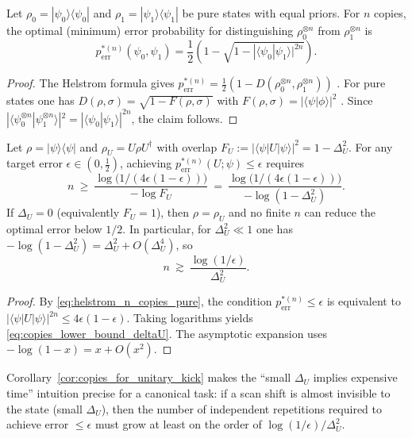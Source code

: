 \begin{proposition}
\label{prop:helstrom_n_copies_pure}
Let $\rho_0=|\psi_0\rangle\langle\psi_0|$ and $\rho_1=|\psi_1\rangle\langle\psi_1|$ be pure states with equal priors.
For $n$ copies, the optimal (minimum) error probability for distinguishing $\rho_0^{\otimes n}$ from $\rho_1^{\otimes n}$ is
\begin{equation}
p_{\mathrm{err}}^{*(n)}(\psi_0,\psi_1)=\frac12\left(1-\sqrt{1-|\langle\psi_0|\psi_1\rangle|^{2n}}\right).
\label{eq:helstrom_n_copies_pure}
\end{equation}
\end{proposition}

\begin{proof}
The Helstrom formula gives $p_{\mathrm{err}}^{*(n)}=\tfrac12(1-D(\rho_0^{\otimes n},\rho_1^{\otimes n}))$ \cite{Helstrom1976,Watrous2018}.
For pure states one has $D(\rho,\sigma)=\sqrt{1-F(\rho,\sigma)}$ with $F(\rho,\sigma)=|\langle\psi|\phi\rangle|^2$ \cite{Watrous2018}.
Since $|\langle\psi_0^{\otimes n}|\psi_1^{\otimes n}\rangle|^2=|\langle\psi_0|\psi_1\rangle|^{2n}$, the claim follows.
\end{proof}

\begin{corollary}
\label{cor:copies_for_unitary_kick}
Let $\rho=|\psi\rangle\langle\psi|$ and $\rho_U=U\rho U^{\dagger}$ with overlap $F_U:=|\langle\psi|U|\psi\rangle|^2=1-\Delta_U^2$.
For any target error $\epsilon\in(0,\tfrac12)$, achieving $p_{\mathrm{err}}^{*(n)}(U;\psi)\le\epsilon$ requires
\begin{equation}
n\ \ge\ \frac{\log\!\bigl(1/(4\epsilon(1-\epsilon))\bigr)}{-\log F_U}
\ =\ \frac{\log\!\bigl(1/(4\epsilon(1-\epsilon))\bigr)}{-\log(1-\Delta_U^2)}.
\label{eq:copies_lower_bound_deltaU}
\end{equation}
If $\Delta_U=0$ (equivalently $F_U=1$), then $\rho=\rho_U$ and no finite $n$ can reduce the optimal error below $1/2$.
In particular, for $\Delta_U^2\ll 1$ one has $-\log(1-\Delta_U^2)=\Delta_U^2+O(\Delta_U^4)$, so
\begin{equation}
n\ \gtrsim\ \frac{\log(1/\epsilon)}{\Delta_U^2}.
\label{eq:copies_asymptotic_deltaU}
\end{equation}
\end{corollary}

\begin{proof}
By \eqref{eq:helstrom_n_copies_pure}, the condition $p_{\mathrm{err}}^{*(n)}\le\epsilon$ is equivalent to
$|\langle\psi|U|\psi\rangle|^{2n}\le 4\epsilon(1-\epsilon)$.
Taking logarithms yields \eqref{eq:copies_lower_bound_deltaU}.
The asymptotic expansion uses $-\log(1-x)=x+O(x^2)$.
\end{proof}

Corollary~\ref{cor:copies_for_unitary_kick} makes the ``small $\Delta_U$ implies expensive time'' intuition precise for a canonical task:
if a scan shift is almost invisible to the state (small $\Delta_U$), then the number of independent repetitions required to achieve error $\le\epsilon$ must grow at least on the order of $\log(1/\epsilon)/\Delta_U^2$.
